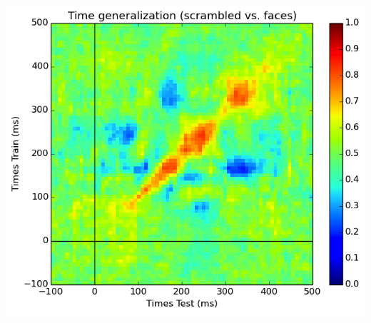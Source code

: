 \documentclass[t,11pt,compress]{beamer} %
\begin{document}
\begin{frame}[plain,t,c]
\begin{minipage}{1.09\linewidth}
\begin{minipage}{.155\linewidth}
\end{minipage}
\hspace{.4em}%
\begin{minipage}{.19\linewidth}
    \includegraphics[width=\linewidth]{plot_decoding_time_generalization_1.png}%
\end{minipage}
\vspace{1em}%
\end{minipage}
\smallskip
~
\end{frame}
\end{document}
